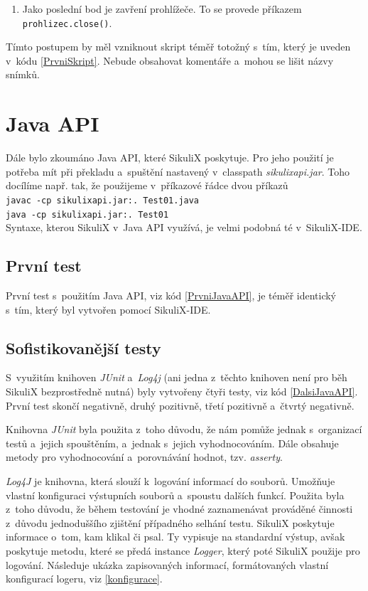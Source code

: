 \begin{enumerate}
\begin{figure}[ht!]
					\end{figure}
					\FloatBarrier
				\item Jako poslední bod je zavření prohlížeče. To se provede příkazem\\\texttt{prohlizec.close()}.
			\end{enumerate}
			Tímto postupem by měl vzniknout skript téměř totožný s~tím, který je uveden v~kódu \ref{PrvniSkript}. Nebude obsahovat komentáře a~mohou se lišit názvy snímků.
		
			
		
	\section{Java API}
	Dále bylo zkoumáno Java API, které SikuliX poskytuje. Pro jeho použití je potřeba mít při překladu a~spuštění nastavený v~classpath \emph{sikulixapi.jar}. Toho docílíme např. tak, že použijeme v~příkazové řádce dvou příkazů\\\texttt{javac -cp sikulixapi.jar:. Test01.java}\\\texttt{java -cp sikulixapi.jar:. Test01}\\ Syntaxe, kterou SikuliX v~Java API využívá, je velmi podobná té v~SikuliX-IDE.
	
		\subsection{První test}
		První test s~použitím Java API, viz kód \ref{PrvniJavaAPI}, je téměř identický s~tím, který byl vytvořen pomocí SikuliX-IDE.
		
			
	
		\subsection{Sofistikovanější testy}
		S~využitím knihoven \emph{JUnit} a~\emph{Log4j} (ani jedna z~těchto knihoven není pro běh SikuliX bezprostředně nutná) byly vytvořeny čtyři testy, viz kód \ref{DalsiJavaAPI}. První test skončí negativně, druhý pozitivně, třetí pozitivně a~čtvrtý negativně.
		
		Knihovna \emph{JUnit} byla použita z~toho důvodu, že nám pomůže jednak s~organizací testů a~jejich spouštěním, a~jednak s~jejich vyhodnocováním. Dále obsahuje metody pro vyhodnocování a~porovnávání hodnot, tzv. \emph{asserty}.
		
		\emph{Log4J} je knihovna, která slouží k~logování informací do souborů. Umožňuje vlastní konfiguraci výstupních souborů a~spoustu dalších funkcí. Použita byla z~toho důvodu, že během testování je vhodné zaznamenávat prováděné činnosti z~důvodu jednoduššího zjištění případného selhání testu. SikuliX poskytuje informace o~tom, kam klikal či psal. Ty vypisuje na standardní výstup, avšak poskytuje metodu, které se předá instance \emph{Logger}, který poté SikuliX použije pro logování. Následuje ukázka zapisovaných informací, formátovaných vlastní konfigurací logeru, viz \ref{konfigurace}.
		